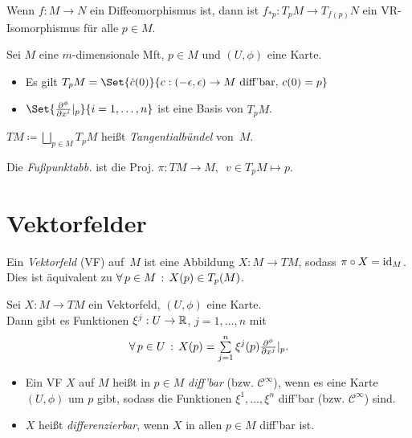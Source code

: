 \documentclass{cheat-sheet}
\newcommand{\coord}[1]{\tfrac{\partial^\phi}{\partial x^{#1}}} %
\newcommand{\Cont}{\mathcal{C}} %
\begin{document}
\begin{kor}
  Wenn $f : M \to N$ ein Diffeomorphismus ist, dann ist $f_{*p} : T_p M \to T_{f(p)} N$ ein VR-Isomorphismus für alle $p \in M$.
\end{kor}

\begin{satz}
  Sei $M$ eine $m$-dimensionale Mft, $p \in M$ und $(U, \phi)$ eine Karte.
  \begin{itemize}
    \item Es gilt $T_p M = \Set{ \dot{c}(0) }{ c : \ointerval{-\epsilon}{\epsilon} \to M \text{ diff'bar}, \, c(0) = p }$
    \item $\Set{\coord{i}|_p}{i=1, \ldots, n}$ ist eine Basis von $T_p M$.
  \end{itemize}
\end{satz}

\begin{defn}
  $TM \coloneqq {\bigsqcup}_{p \in M} T_p M$ heißt \emph{Tangentialbündel} von~$M$.
\end{defn}


\begin{defn}
  Die \emph{Fußpunktabb.} ist die Proj.
  $\pi : TM \to M, \enspace v \in T_p M \mapsto p$.
\end{defn}

\section{Vektorfelder}

\begin{defn}
  Ein \emph{Vektorfeld} (VF) auf~$M$ ist eine Abbildung $X : M \to TM$, sodass $\pi \circ X = \operatorname{id}_M$. Dies ist äquivalent zu $\forall \, {p \in M} \,:\, X(p) \in T_p(M)$.
\end{defn}

\begin{lem}
  Sei $X : M \to TM$ ein Vektorfeld, $(U, \phi)$ eine Karte. \\
  Dann gibt es Funktionen $\xi^j : U \to \mathbb{R}$, $j = 1, \ldots, n$ mit
  \[ \fa{p \in U} X(p) = \sum_{j=1}^n \xi^j(p) \coord{j}|_p. \]
\end{lem}

\begin{defn}
  \begin{itemize}
    \item Ein VF $X$ auf $M$ heißt in $p \in M$ \emph{diff'bar} (bzw. $\Cont^\infty$), wenn es eine Karte $(U, \phi)$ um $p$ gibt, sodass die Funktionen $\xi^1, \ldots, \xi^n$ diff'bar (bzw. $\Cont^\infty$) sind.
    \item $X$ heißt \emph{differenzierbar}, wenn $X$ in allen $p \in M$ diff'bar ist.
  \end{itemize}
\end{defn}
\end{document}
